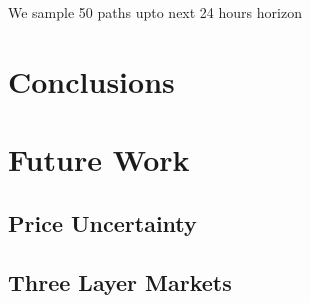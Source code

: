 \documentclass[11pt,twoside]{article}
\begin{document}
We sample 50 paths upto next 24 hours horizon
\section{Conclusions}
\section{Future Work}
\subsection{Price Uncertainty}
\subsection{Three Layer Markets}




\end{document}
